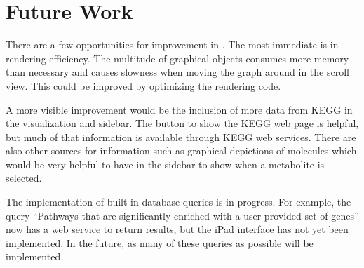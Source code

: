 \section{Future Work}
\label{sect:kegg_future_work}


There are a few opportunities for improvement in \keggapp. The most immediate is
in rendering efficiency. The multitude of graphical objects consumes more memory
than necessary and causes slowness when moving the graph around in the scroll
view. This could be improved by optimizing the rendering code.

A more visible improvement would be the inclusion of more data from KEGG in the
visualization and sidebar. The button to show the KEGG web page is helpful, but
much of that information is available through KEGG web services. There are also
other sources for information such as graphical depictions of molecules which
would be very helpful to have in the sidebar to show when a metabolite is
selected.

The implementation of built-in \pathcasekegg database queries is in progress.
For example, the query ``Pathways that are significantly enriched with a
user-provided set of genes'' now has a web service to return results, but the
iPad interface has not yet been implemented. In the future, as many of these
queries as possible will be implemented.

